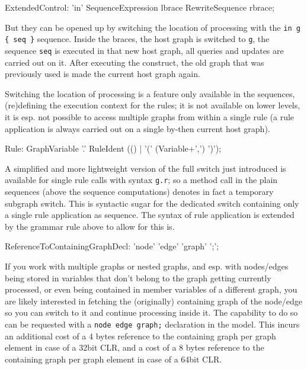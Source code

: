 \begin{rail} 
  ExtendedControl: 
    'in' SequenceExpression lbrace RewriteSequence rbrace;
\end{rail}

But they can be opened up by switching the location of processing with the \verb#in g { seq }# sequence.
Inside the braces, the host graph is switched to \texttt{g}, the sequence \texttt{seq} is executed in that new host graph, all queries and updates are carried out on it. 
After executing the construct, the old graph that was previously used is made the current host graph again.

Switching the location of processing is a feature only available in the sequences, (re)defining the execution context for the rules; it is not available on lower levels, it is esp. not possible to access multiple graphs from within a single rule (a rule application is always carried out on a single by-then current host graph).

\begin{rail}
  Rule: GraphVariable '.' RuleIdent (() | '(' (Variable+',') ')');
\end{rail}

A simplified and more lightweight version of the full switch just introduced is available for single rule calls with syntax \verb#g.r#; so a method call in the plain sequences (above the sequence computations) denotes in fact a temporary subgraph switch.
This is syntactic sugar for the dedicated switch containing only a single rule application as sequence.
The syntax of rule application is extended by the grammar rule above to allow for this is.

\begin{rail}
  ReferenceToContainingGraphDecl: 'node' 'edge' 'graph' ';';
\end{rail}

If you work with multiple graphs or nested graphs, and esp. with nodes/edges being stored in variables that don't belong to the graph getting currently processed, or even being contained in member variables of a different graph, you are likely interested in fetching the (originally) containing graph of the node/edge so you can switch to it and continue processing inside it.
The capability to do so can be requested with a \texttt{node edge graph;} declaration in the model.
This incurs an additional cost of a 4 bytes reference to the containing graph per graph element in case of a 32bit CLR, and a cost of a 8 bytes reference to the containing graph per graph element in case of a 64bit CLR.

